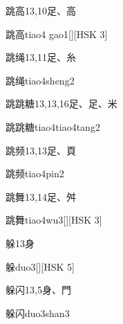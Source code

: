 \begin{entry}{跳高}{13,10}{⾜、⾼}
  \begin{phonetics}{跳高}{tiao4 gao1}[][HSK 3]
  \end{phonetics}
\end{entry}

\begin{entry}{跳绳}{13,11}{⾜、⽷}
  \begin{phonetics}{跳绳}{tiao4sheng2}
  \end{phonetics}
\end{entry}

\begin{entry}{跳跳糖}{13,13,16}{⾜、⾜、⽶}
  \begin{phonetics}{跳跳糖}{tiao4tiao4tang2}
  \end{phonetics}
\end{entry}

\begin{entry}{跳频}{13,13}{⾜、⾴}
  \begin{phonetics}{跳频}{tiao4pin2}
  \end{phonetics}
\end{entry}

\begin{entry}{跳舞}{13,14}{⾜、⾇}
  \begin{phonetics}{跳舞}{tiao4wu3}[][HSK 3]
  \end{phonetics}
\end{entry}

\begin{entry}{躲}{13}{⾝}
  \begin{phonetics}{躲}{duo3}[][HSK 5]
  \end{phonetics}
\end{entry}

\begin{entry}{躲闪}{13,5}{⾝、⾨}
  \begin{phonetics}{躲闪}{duo3shan3}
  \end{phonetics}
\end{entry}

